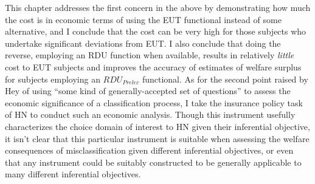 \documentclass[../main.tex]{subfiles}
\begin{document}
This chapter addresses the first concern in the above by demonstrating how much the cost is in economic terms of using the EUT functional instead of some alternative, and I conclude that the cost can be very high for those subjects who undertake significant deviations from EUT.
I also conclude that doing the reverse, employing an RDU function when available, results in relatively \textit{little} cost to EUT subjects and improves the accuracy of estimates of welfare surplus for subjects employing an $\mathit{RDU_{Prelec}}$ functional.
As for the second point raised by Hey of using \enquote{some kind of generally-accepted set of questions} to assess the economic significance of a classification process, I take the insurance policy task of HN to conduct such an economic analysis.
Though this instrument usefully characterizes the choice domain of interest to HN given their inferential objective, it isn't clear that this particular instrument is suitable when assessing the welfare consequences of misclassification given different inferential objectives, or even that any instrument could be suitably constructed to be generally applicable to many different inferential objectives.


\end{document}
